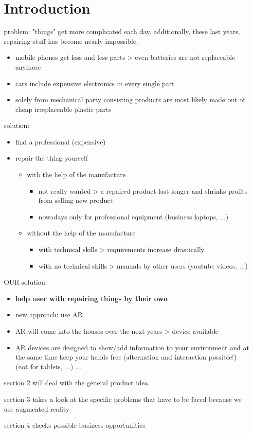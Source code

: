 
\chapter{Introduction}
	
	problem: "things" get more complicated each day. additionally, these last years, repairing stuff has become nearly impossible.
	
	\begin{itemize}
		\itemsep0em
		\item mobile phones get less and less parts > even batteries are not replaceable anymore
		\item cars include expensive electronics in every single part
		\item solely from mechanical party consisting products are most likely made out of cheap irreplaceable plastic parts
	\end{itemize}
	
	solution:
	\begin{itemize}
		\itemsep0em
		\item find a professional (expensive)
		\item repair the thing yourself \begin{itemize}
			\itemsep0em
			\item with the help of the manufacture \begin{itemize}
				\item not really wanted > a repaired product last longer and shrinks profits from selling new product
				\item nowadays only for professional equipment (business laptops, ...)
			\end{itemize}
			\item without the help of the manufacture \begin{itemize}
				\itemsep0em
				\item with technical skills > requirements increase drastically
				\item with no technical skills > manuals by other users (youtube videos, ...)
			\end{itemize}
		\end{itemize}
	\end{itemize}
	
	OUR solution:
	\begin{itemize}
		\itemsep0em
		\item \textbf{help user with repairing things by their own}
		\item new approach: use AR
		\item AR will come into the houses over the next years > device available
		\item AR devices are designed to show/add information to your environment and at the same time keep your hands free (alternation and interaction possible!) (not for tablets, ...) ...
	\end{itemize}
	
	
	section 2 will deal with the general product idea.
	
	section 3 takes a look at the specific problems that have to be faced because we use augmented reality
	
	section 4 checks possible business opportunities
	